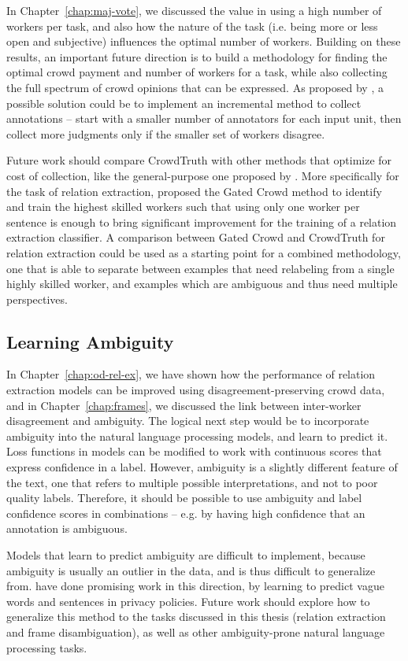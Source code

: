 In Chapter~\ref{chap:maj-vote}, we discussed the value in using a high number of workers per task, and also how the nature of the task (i.e. being more or less open and subjective) influences the optimal number of workers. Building on these results, an important future direction is to build a methodology for finding the optimal crowd payment and number of workers for a task, while also collecting the full spectrum of crowd opinions that can be expressed. As proposed by \citet{lin2014re}, a possible solution could be to implement an incremental method to collect annotations -- start with a smaller number of annotators for each input unit, then collect more judgments only if the smaller set of workers disagree.

Future work should compare CrowdTruth with other methods that optimize for cost of collection, like the general-purpose one proposed by \citet{Mizusawa:2018:EPP:3269206.3269292}. More specifically for the task of relation extraction, \citet{liu2016effective} proposed the Gated Crowd method to identify and train the highest skilled workers such that using only one worker per sentence is enough to bring significant improvement for the training of a relation extraction classifier. A comparison between Gated Crowd and CrowdTruth for relation extraction could be used as a starting point for a combined methodology, one that is able to separate between examples that need relabeling from a single highly skilled worker, and examples which are ambiguous and thus need multiple perspectives.


\subsection{Learning Ambiguity}

In Chapter~\ref{chap:od-rel-ex}, we have shown how the performance of relation extraction models can be improved using disagreement-preserving crowd data, and in Chapter~\ref{chap:frames}, we discussed the link between inter-worker disagreement and ambiguity. The logical next step would be to incorporate ambiguity into the natural language processing models, and learn to predict it. 
Loss functions in models can be modified to work with continuous scores that express confidence in a label. However, ambiguity is a slightly different feature of the text, one that refers to multiple possible interpretations, and not to poor quality labels. Therefore, it should be possible to use ambiguity and label confidence scores in combinations -- e.g. by having high confidence that an annotation is ambiguous.

Models that learn to predict ambiguity are difficult to implement, because ambiguity is usually an outlier in the data, and is thus difficult to generalize from. \citet{lebanoff2018automatic} have done promising work in this direction, by learning to predict vague words and sentences in privacy policies. Future work should explore how to generalize this method to the tasks discussed in this thesis (relation extraction and frame disambiguation), as well as other ambiguity-prone natural language processing tasks.
